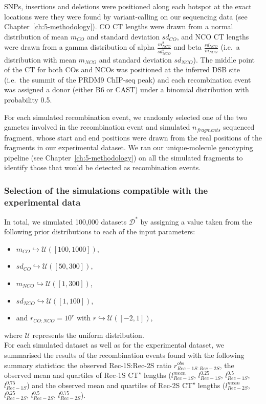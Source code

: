 SNPs, insertions and deletions were positioned along each hotspot at the exact locations were they were found by variant-calling on our sequencing data (see Chapter~\ref{ch:5-methodology}). 
CO CT lengths were drawn from a normal distribution of mean $m_{CO}$ and standard deviation $sd_{CO}$, and NCO CT lengths were drawn from a gamma distribution of alpha $\frac{m_{NCO}^{2}}{sd_{NCO}^{2}}$ and beta $\frac{sd_{NCO}}{m_{NCO}}$ (i.e.\ a distribution with mean $m_{NCO}$ and standard deviation $sd_{NCO}$). 
The middle point of the CT for both COs and NCOs was positioned at the inferred DSB site (i.e.\ the summit of the PRDM9 ChIP-seq peak) and each recombination event was assigned a donor (either B6 or CAST) under a binomial distribution with probability 0.5.

For each simulated recombination event, we randomly selected one of the two gametes involved in the recombination event and simulated $n_{fragments}$ sequenced fragment, whose start and end positions were drawn from the real positions of the fragments in our experimental dataset. 
We ran our unique-molecule genotyping pipeline (see Chapter~\ref{ch:5-methodology}) on all the simulated fragments to identify those that would be detected as recombination events.



\subsubsection{Selection of the simulations compatible with the experimental data}
In total, we simulated 100,000 datasets $\mathcal{D^{*}}$ by assigning a value taken from the following prior distributions to each of the input parameters: 
\begin{itemize}
    \item $m_{CO} \hookrightarrow \mathcal{U}([100, 1000])$, 
    \item $sd_{CO} \hookrightarrow \mathcal{U}([50, 300])$,
    \item $m_{NCO} \hookrightarrow \mathcal{U}([1, 300])$, 
    \item $sd_{NCO} \hookrightarrow \mathcal{U}([1, 100])$,
    \item and $r_{CO:NCO} = 10^{r}$ with $r \hookrightarrow \mathcal{U}([-2, 1])$,
\end{itemize}
where $\mathcal{U}$ represents the uniform distribution.\\

For each simulated dataset as well as for the experimental dataset, we summarised the results of the recombination events found with the following summary statistics: the observed Rec-1S:Rec-2S ratio $r_{Rec-1S:Rec-2S}^{obs}$, the observed mean and quartiles of Rec-1S CT\textsuperscript{$\star$} lengths ($l_{Rec-1S}^{mean}$, $l_{Rec-1S}^{0.25}$, $l_{Rec-1S}^{0.5}$, $l_{Rec-1S}^{0.75}$) and the observed mean and quartiles of Rec-2S CT\textsuperscript{$\star$} lengths ($l_{Rec-2S}^{mean}$, $l_{Rec-2S}^{0.25}$, $l_{Rec-2S}^{0.5}$, $l_{Rec-2S}^{0.75}$). 

